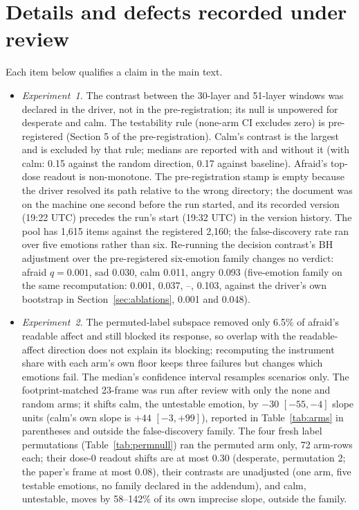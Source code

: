 \documentclass{article}
\begin{document}
\section{Details and defects recorded under review}
\label{app:details}
Each item below qualifies a claim in the main text.
\begin{itemize}[leftmargin=1.2em,itemsep=1pt,topsep=2pt]
\item \emph{Experiment~1.} The contrast between the 30-layer and 51-layer windows was declared in the driver, not in the pre-registration; its null is unpowered for desperate and calm. The testability rule (none-arm CI excludes zero) is pre-registered (Section 5 of the pre-registration). Calm's contrast is the largest and is excluded by that rule; medians are reported with and without it (with calm: 0.15 against the random direction, 0.17 against baseline). Afraid's top-dose readout is non-monotone. The pre-registration stamp is empty because the driver resolved its path relative to the wrong directory; the document was on the machine one second before the run started, and its recorded version (19:22 UTC) precedes the run's start (19:32 UTC) in the version history. The pool has 1,615 items against the registered 2,160; the false-discovery rate ran over five emotions rather than six. Re-running the decision contrast's BH adjustment over the pre-registered six-emotion family changes no verdict: afraid $q=0.001$, sad 0.030, calm 0.011, angry 0.093 (five-emotion family on the same recomputation: 0.001, 0.037, --, 0.103, against the driver's own bootstrap in Section~\ref{sec:ablations}, 0.001 and 0.048).
\item \emph{Experiment~2.} The permuted-label subspace removed only 6.5\% of afraid's readable affect and still blocked its response, so overlap with the readable-affect direction does not explain its blocking; recomputing the instrument share with each arm's own floor keeps three failures but changes which emotions fail. The median's confidence interval resamples scenarios only. The footprint-matched 23-frame was run after review with only the none and random arms; it shifts calm, the untestable emotion, by $-30$ $[-55, -4]$ slope units (calm's own slope is $+44$ $[-3, +99]$), reported in Table~\ref{tab:arms} in parentheses and outside the false-discovery family. The four fresh label permutations (Table~\ref{tab:permnull}) ran the permuted arm only, 72 arm-rows each; their dose-0 readout shifts are at most 0.30 (desperate, permutation 2; the paper's frame at most 0.08), their contrasts are unadjusted (one arm, five testable emotions, no family declared in the addendum), and calm, untestable, moves by 58--142\% of its own imprecise slope, outside the family.

\end{itemize}
\end{document}
